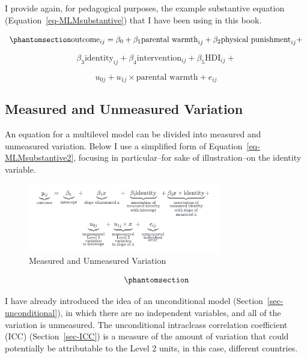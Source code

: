 \documentclass[
  letterpaper,
  DIV=11,
  numbers=noendperiod]{scrreprt}
\begin{document}
I provide again, for pedagogical purposes, the example substantive
equation (Equation~\ref{eq-MLMsubstantive}) that I have been using in
this book.

\begin{equation}\phantomsection\label{eq-MLMsubstantive2}{\text{outcome}_{ij} = \beta_0 + \beta_1 \text{parental warmth}_{ij} + \beta_2 \text{physical punishment}_{ij} +}\end{equation}

\[\beta_3 \text{identity}_{ij} + \beta_4 \text{intervention}_{ij} + \beta_5 \text{HDI}_{ij} + \]

\[u_{0j} + u_{1j} \times \text{parental warmth} + e_{ij}\]

\subsection{Measured and Unmeasured
Variation}\label{sec-measured-and-unmeasured-variation}

An equation for a multilevel model can be divided into measured and
unmeasured variation. Below I use a simplified form of
Equation~\ref{eq-MLMsubstantive2}, focusing in particular--for sake of
illustration--on the identity variable.

\begin{figure}[H]

{\centering \includegraphics[width=0.75\textwidth,height=\textheight]{measured-and-unmeasured-variation.png}

}

\caption{Measured and Unmeasured Variation}

\end{figure}%

\begin{equation}\phantomsection\label{eq-measured-and-unmeasured-variation}{\!}\end{equation}

I have already introduced the idea of an unconditional model
(Section~\ref{sec-unconditional}), in which there are no independent
variables, and all of the variation is unmeasured. The unconditional
intraclcass correlation coefficient (ICC) (Section~\ref{sec-ICC}) is a
measure of the amount of variation that could potentially be
attributable to the Level 2 units, in this case, different countries.
\end{document}

